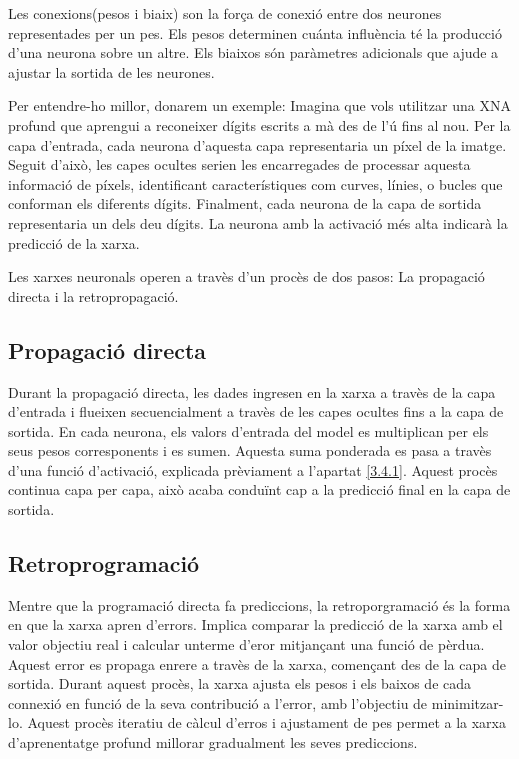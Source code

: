 Les conexions(pesos i biaix) son la força de conexió entre dos neurones representades per un pes. Els pesos determinen cuánta influència té la producció d'una neurona sobre un altre. Els biaixos són paràmetres adicionals que ajude a ajustar la sortida de les neurones.

Per entendre-ho millor, donarem un exemple: Imagina que vols utilitzar una XNA profund que aprengui a reconeixer dígits escrits a mà des de l'ú fins al nou. Per la capa d'entrada, cada neurona d'aquesta capa representaria un píxel de la imatge. Seguit d'això, les capes ocultes serien les encarregades de processar aquesta informació de píxels, identificant característiques com curves, línies, o bucles que conforman els diferents dígits. Finalment, cada neurona de la capa de sortida representaria un dels deu dígits. La neurona amb la activació més alta indicarà la predicció de la xarxa.

Les xarxes neuronals operen a travès d'un procès de dos pasos: La propagació directa i la retropropagació.

\subsection{Propagació directa}
Durant la propagació directa, les dades ingresen en la xarxa a travès de la capa d'entrada i flueixen secuencialment a travès de les capes ocultes fins a la capa de sortida. En cada neurona, els valors d'entrada del model es multiplican per els seus pesos corresponents i es sumen. Aquesta suma ponderada es pasa a travès d'una funció d'activació, explicada prèviament a l'apartat \ref{3.4.1}. Aquest procès continua capa per capa, això acaba conduïnt cap a la predicció final en la capa de sortida.
\subsection{Retroprogramació}
Mentre que la programació directa fa prediccions, la retroporgramació és la forma en que la xarxa apren d'errors. Implica comparar la predicció de la xarxa amb el valor objectiu real i calcular unterme d'eror mitjançant una funció de pèrdua.
Aquest error es propaga enrere a travès de la xarxa, començant des de la capa de sortida. Durant aquest procès, la xarxa ajusta els pesos i els baixos de cada connexió en funció de la seva contribució a l'error, amb l'objectiu de minimitzar-lo.
Aquest procès iteratiu de càlcul d'erros i ajustament de pes permet a la xarxa d'aprenentatge profund millorar gradualment les seves prediccions.



